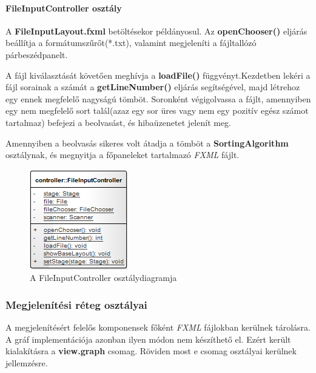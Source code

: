 \documentclass{elteikthesis}
\begin{document}
\paragraph{FileInputController osztály}
A \textbf{FileInputLayout.fxml} betöltésekor példányosul. Az \textbf{openChooser()} eljárás beállítja a formátumszűrőt(*.txt), valamint megjeleníti a fájltallózó párbeszédpanelt.\par A fájl kiválasztását követően meghívja a \textbf{loadFile()} függvényt.Kezdetben lekéri a fájl sorainak a számát a \textbf{getLineNumber()} eljárás segítségével, majd létrehoz egy ennek megfelelő nagyságú tömböt. Soronként végigolvassa a fájlt, amennyiben egy nem megfelelő sort talál(azaz egy sor üres vagy nem egy pozitív egész számot tartalmaz) befejezi a beolvasást, és hibaüzenetet jelenít meg.\par Amennyiben a beolvasás sikeres volt átadja a tömböt a \textbf{SortingAlgorithm} osztálynak, és megnyitja a főpaneleket tartalmazó \emph{FXML} fájlt.
\begin{figure}[H]
	\centering
	\includegraphics{pics/class/FileInputController.png}
	\caption{A FileInputController osztálydiagramja}
\end{figure}\par
\subsubsection{Megjelenítési réteg osztályai}
A megjelenítésért felelős komponensek főként \emph{FXML} fájlokban kerülnek tárolásra. A gráf implementációja azonban ilyen módon nem készíthető el. Ezért került kialakításra a \textbf{view.graph} csomag. Röviden most e csomag osztályai kerülnek jellemzésre.
\end{document}
